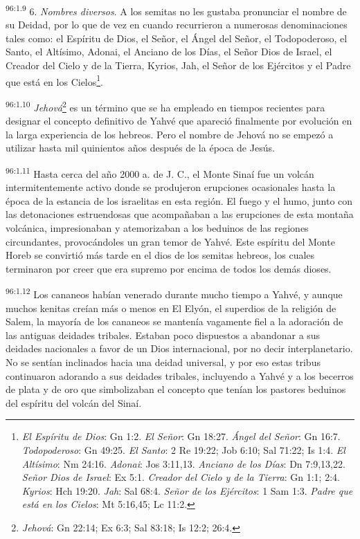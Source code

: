 \par
\textsuperscript{96:1.9} 6. \textit{Nombres diversos}. A los semitas no les gustaba pronunciar el nombre de su Deidad, por lo que de vez en cuando recurrieron a numerosas denominaciones tales como: el Espíritu de Dios, el Señor, el Ángel del Señor, el Todopoderoso, el Santo, el Altísimo, Adonai, el Anciano de los Días, el Señor Dios de Israel, el Creador del Cielo y de la Tierra, Kyrios, Jah, el Señor de los Ejércitos y el Padre que está en los Cielos\footnote{\textit{El Espíritu de Dios}: Gn 1:2. \textit{El Señor}: Gn 18:27. \textit{Ángel del Señor}: Gn 16:7. \textit{Todopoderoso}: Gn 49:25. \textit{El Santo}: 2 Re 19:22; Job 6:10; Sal 71:22; Is 1:4. \textit{El Altísimo}: Nm 24:16. \textit{Adonai}: Jos 3:11,13. \textit{Anciano de los Días}: Dn 7:9,13,22. \textit{Señor Dios de Israel}: Ex 5:1. \textit{Creador del Cielo y de la Tierra}: Gn 1:1; 2:4. \textit{Kyrios}: Hch 19:20. \textit{Jah}: Sal 68:4. \textit{Señor de los Ejércitos}: 1 Sam 1:3. \textit{Padre que está en los Cielos}: Mt 5:16,45; Lc 11:2.}.

\par
\textsuperscript{96:1.10} \textit{Jehová}\footnote{\textit{Jehová}: Gn 22:14; Ex 6:3; Sal 83:18; Is 12:2; 26:4.} es un término que se ha empleado en tiempos recientes para designar el concepto definitivo de Yahvé que apareció finalmente por evolución en la larga experiencia de los hebreos. Pero el nombre de Jehová no se empezó a utilizar hasta mil quinientos años después de la época de Jesús.

\par
\textsuperscript{96:1.11} Hasta cerca del año 2000 a. de J. C., el Monte Sinaí fue un volcán intermitentemente activo donde se produjeron erupciones ocasionales hasta la época de la estancia de los israelitas en esta región. El fuego y el humo, junto con las detonaciones estruendosas que acompañaban a las erupciones de esta montaña volcánica, impresionaban y atemorizaban a los beduinos de las regiones circundantes, provocándoles un gran temor de Yahvé. Este espíritu del Monte Horeb se convirtió más tarde en el dios de los semitas hebreos, los cuales terminaron por creer que era supremo por encima de todos los demás dioses.

\par
\textsuperscript{96:1.12} Los cananeos habían venerado durante mucho tiempo a Yahvé, y aunque muchos kenitas creían más o menos en El Elyón, el superdios de la religión de Salem, la mayoría de los cananeos se mantenía vagamente fiel a la adoración de las antiguas deidades tribales. Estaban poco dispuestos a abandonar a sus deidades nacionales a favor de un Dios internacional, por no decir interplanetario. No se sentían inclinados hacia una deidad universal, y por eso estas tribus continuaron adorando a sus deidades tribales, incluyendo a Yahvé y a los becerros de plata y de oro que simbolizaban el concepto que tenían los pastores beduinos del espíritu del volcán del Sinaí.

